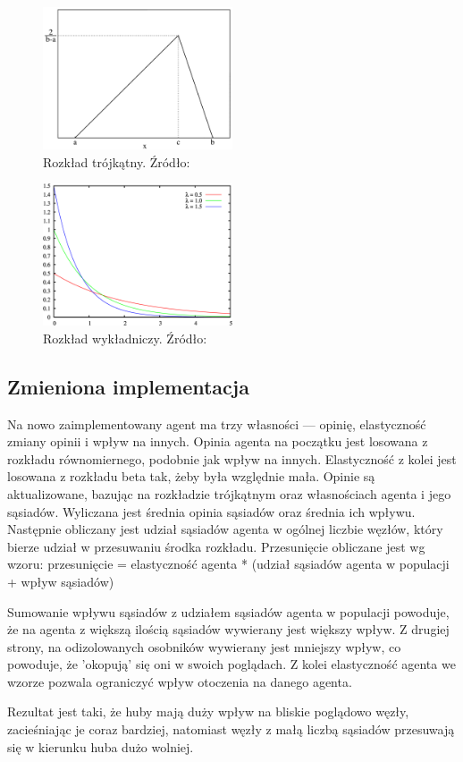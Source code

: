 \begin{figure}
    \centering
    \includegraphics[width=0.5\textwidth]{img/Triangular_distribution_PMF.png}
    \caption{Rozkład trójkątny. Źródło: \cite{rozklad_trojkatny_wykres}}
    \label{fig:rozklad_trojkatny}
\end{figure}
\begin{figure}
    \centering
    \includegraphics[width=0.5\textwidth]{img/Exponential_distribution_pdf.png}
    \caption{Rozkład wykładniczy. Źródło: \cite{rozklad_wykladniczy_wykres}}
    \label{fig:rozklad_wykladniczy}
\end{figure}

\newpage

\subsection{Zmieniona implementacja}

Na nowo zaimplementowany agent ma trzy własności — opinię, elastyczność zmiany opinii i wpływ na innych.
Opinia agenta na początku jest losowana z rozkładu równomiernego, podobnie jak wpływ na innych.
Elastyczność z kolei jest losowana z rozkładu beta tak, żeby była względnie mała.
Opinie są aktualizowane, bazując na rozkładzie trójkątnym oraz własnościach agenta i jego sąsiadów.
Wyliczana jest średnia opinia sąsiadów oraz średnia ich wpływu.
Następnie obliczany jest udział sąsiadów agenta w ogólnej liczbie węzłów, który bierze udział w przesuwaniu środka rozkładu.
Przesunięcie obliczane jest wg wzoru:
przesunięcie = elastyczność agenta * (udział sąsiadów agenta w populacji + wpływ sąsiadów)

Sumowanie wpływu sąsiadów z udziałem sąsiadów agenta w populacji powoduje, że na agenta z większą ilością sąsiadów wywierany jest większy wpływ.
Z drugiej strony, na odizolowanych osobników wywierany jest mniejszy wpływ, co powoduje, że 'okopują' się oni w swoich poglądach.
Z kolei elastyczność agenta we wzorze pozwala ograniczyć wpływ otoczenia na danego agenta.

Rezultat jest taki, że huby mają duży wpływ na bliskie poglądowo węzły, zacieśniając je coraz bardziej, natomiast węzły z małą liczbą sąsiadów przesuwają się w kierunku huba dużo wolniej.